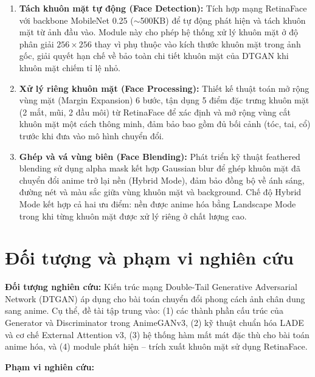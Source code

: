 \begin{enumerate}
    \item \textbf{Tách khuôn mặt tự động (Face Detection):} Tích hợp mạng RetinaFace với backbone MobileNet 0.25 ($\sim$500KB) để tự động phát hiện và tách khuôn mặt từ ảnh đầu vào. Module này cho phép hệ thống xử lý khuôn mặt ở độ phân giải $256 \times 256$ thay vì phụ thuộc vào kích thước khuôn mặt trong ảnh gốc, giải quyết hạn chế về bảo toàn chi tiết khuôn mặt của DTGAN khi khuôn mặt chiếm tỉ lệ nhỏ.
    \item \textbf{Xử lý riêng khuôn mặt (Face Processing):} Thiết kế thuật toán mở rộng vùng mặt (Margin Expansion) 6 bước, tận dụng 5 điểm đặc trưng khuôn mặt (2 mắt, mũi, 2 đầu môi) từ RetinaFace để xác định và mở rộng vùng cắt khuôn mặt một cách thông minh, đảm bảo bao gồm đủ bối cảnh (tóc, tai, cổ) trước khi đưa vào mô hình chuyển đổi.
    \item \textbf{Ghép và vá vùng biên (Face Blending):} Phát triển kỹ thuật feathered blending sử dụng alpha mask kết hợp Gaussian blur để ghép khuôn mặt đã chuyển đổi anime trở lại nền (Hybrid Mode), đảm bảo đồng bộ về ánh sáng, đường nét và màu sắc giữa vùng khuôn mặt và background. Chế độ Hybrid Mode kết hợp cả hai ưu điểm: nền được anime hóa bằng Landscape Mode trong khi từng khuôn mặt được xử lý riêng ở chất lượng cao.
\end{enumerate}

\section*{Đối tượng và phạm vi nghiên cứu}

\textbf{Đối tượng nghiên cứu:} Kiến trúc mạng Double-Tail Generative Adversarial Network (DTGAN) áp dụng cho bài toán chuyển đổi phong cách ảnh chân dung sang anime. Cụ thể, đề tài tập trung vào: (1) các thành phần cấu trúc của Generator và Discriminator trong AnimeGANv3, (2) kỹ thuật chuẩn hóa LADE và cơ chế External Attention v3, (3) hệ thống hàm mất mát đặc thù cho bài toán anime hóa, và (4) module phát hiện -- trích xuất khuôn mặt sử dụng RetinaFace.

\textbf{Phạm vi nghiên cứu:}

